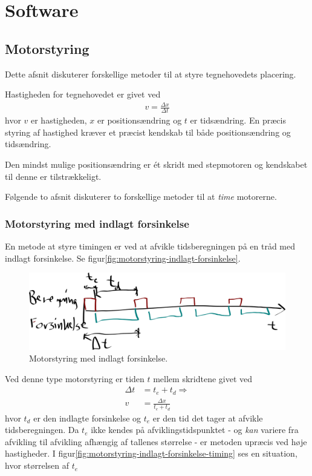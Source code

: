 \chapter[Design af software]{Software}



\section{Motorstyring}


Dette afsnit diskuterer forskellige metoder til at styre tegnehovedets
placering.

Hastigheden for tegnehovedet er givet ved
\begin{align}
  v = \frac{\Delta x}{\Delta t}
\end{align}
hvor $v$ er hastigheden, $x$ er positionsændring og $t$ er
tidsændring. En præcis styring af hastighed kræver et præcist kendskab
til både positionsændring og tidsændring.

Den mindst mulige positionsændring er ét skridt med
stepmotoren og kendskabet til denne er
tilstrækkeligt.

Følgende to afsnit diskuterer to forskellige metoder til at
\textit{time} motorerne.


\subsection{Motorstyring med indlagt forsinkelse}

En metode at styre timingen er ved at afvikle tidsberegningen på en
tråd med indlagt forsinkelse. Se
figur\vref{fig:motorstyring-indlagt-forsinkelse}.

\begin{figure}[htbp]
  \centering
  \includegraphics[width=.7\textwidth]{../brugere/kjaergaard/motorstyring-indlagt-forsinkelse}
  \caption{Motorstyring med indlagt forsinkelse.}
  \label{fig:motorstyring-indlagt-forsinkelse}
\end{figure}

Ved denne type motorstyring er tiden $t$ mellem
skridtene givet ved
\begin{align}
  \Delta t &= t_e + t_d \nonumber \Rightarrow \\
  v &= \frac{\Delta x}{t_e + t_d}
\end{align}
hvor $t_d$ er den indlagte forsinkelse og $t_e$ er den tid det tager
at afvikle tidsberegningen. Da $t_e$ ikke kendes på
afviklingstidspunktet - og \textit{kan} variere fra afvikling til
afvikling afhængig af tallenes størrelse - er metoden upræcis ved høje
hastigheder. I figur\vref{fig:motorstyring-indlagt-forsinkelse-timing}
ses en situation, hvor størrelsen af $t_e$

